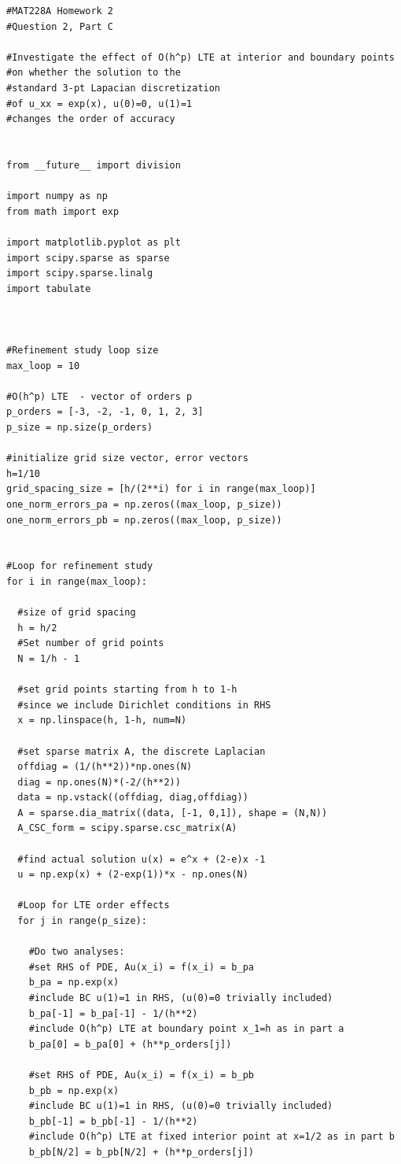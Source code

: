 \documentclass[12pt]{article}
\begin{document}
\begin{verbatim}
#MAT228A Homework 2
#Question 2, Part C

#Investigate the effect of O(h^p) LTE at interior and boundary points
#on whether the solution to the
#standard 3-pt Lapacian discretization 
#of u_xx = exp(x), u(0)=0, u(1)=1
#changes the order of accuracy


from __future__ import division

import numpy as np
from math import exp

import matplotlib.pyplot as plt
import scipy.sparse as sparse
import scipy.sparse.linalg
import tabulate



#Refinement study loop size
max_loop = 10

#O(h^p) LTE  - vector of orders p
p_orders = [-3, -2, -1, 0, 1, 2, 3] 
p_size = np.size(p_orders)

#initialize grid size vector, error vectors
h=1/10
grid_spacing_size = [h/(2**i) for i in range(max_loop)]
one_norm_errors_pa = np.zeros((max_loop, p_size))
one_norm_errors_pb = np.zeros((max_loop, p_size))


#Loop for refinement study
for i in range(max_loop):

  #size of grid spacing
  h = h/2
  #Set number of grid points
  N = 1/h - 1

  #set grid points starting from h to 1-h 
  #since we include Dirichlet conditions in RHS
  x = np.linspace(h, 1-h, num=N)

  #set sparse matrix A, the discrete Laplacian
  offdiag = (1/(h**2))*np.ones(N)
  diag = np.ones(N)*(-2/(h**2))
  data = np.vstack((offdiag, diag,offdiag))
  A = sparse.dia_matrix((data, [-1, 0,1]), shape = (N,N))
  A_CSC_form = scipy.sparse.csc_matrix(A)

  #find actual solution u(x) = e^x + (2-e)x -1
  u = np.exp(x) + (2-exp(1))*x - np.ones(N)
  
  #Loop for LTE order effects 
  for j in range(p_size):
    
    #Do two analyses:
    #set RHS of PDE, Au(x_i) = f(x_i) = b_pa
    b_pa = np.exp(x)
    #include BC u(1)=1 in RHS, (u(0)=0 trivially included)
    b_pa[-1] = b_pa[-1] - 1/(h**2)
    #include O(h^p) LTE at boundary point x_1=h as in part a
    b_pa[0] = b_pa[0] + (h**p_orders[j])

    #set RHS of PDE, Au(x_i) = f(x_i) = b_pb
    b_pb = np.exp(x)
    #include BC u(1)=1 in RHS, (u(0)=0 trivially included)
    b_pb[-1] = b_pb[-1] - 1/(h**2)
    #include O(h^p) LTE at fixed interior point at x=1/2 as in part b
    b_pb[N/2] = b_pb[N/2] + (h**p_orders[j])


\end{verbatim}
\end{document}

